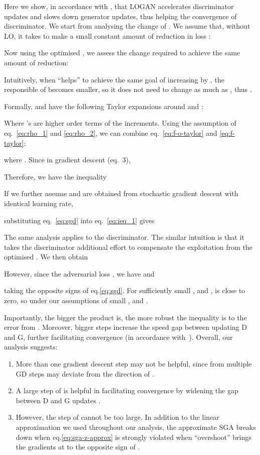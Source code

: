 \documentclass{article} \usepackage{iclr2020_conference,times}
\begin{document}
Here we show, in accordance with \cite{heusel2017gans}, that LOGAN accelerates discriminator updates and slows down generator updates, thus helping the convergence of discriminator.
We start from analysing the change of . We assume that, without LO, it takes  to make a small constant amount of reduction in loss : 

Now using the optimised , we assess the change  required to achieve the same amount of reduction:

Intuitively, when  ``helps''  to achieve the same goal of increasing  by , the responsible of  becomes smaller, so it does not need to change as much as , thus .

Formally,   and  have the following Taylor expansions around  and :

Where 's are higher order terms of the increments.
Using the assumption of eq.~\ref{eq:rho_1} and \ref{eq:rho_2}, we can combine eq.~\ref{eq:f-o-taylor} and \ref{eq:f-taylor}:

where . Since  in gradient descent (eq.~3), 

Therefore, we have the inequality

If we further assume  and   are obtained from stochastic gradient descent with identical learning rate,

substituting eq.~\ref{eq:sgd} into eq.~\ref{eq:ieq_1} gives

The same analysis applies to the discriminator. The similar intuition is that it takes the discriminator additional effort to compensate the exploitation from the optimised . We then obtain

However, since the adversarial loss , we have
 and

taking the opposite signs of eq.\ref{eq:sgd}.  
For sufficiently small ,  and ,  is close to zero, 
so  under our assumptions of small ,  and .

Importantly, the bigger the product  is, the more robust the inequality is to the error from . Moreover, bigger steps increase the speed gap between updating D and G, further facilitating convergence (in accordance with~\cite{heusel2017gans}). Overall, our analysis suggests:
\begin{enumerate}
    \item More than one gradient descent step may not be helpful, since  from multiple GD steps may deviate from the direction of .
    \item A large step of  is helpful in facilitating convergence by widening the gap between D and G updates \citep{heusel2017gans}.
    \item However, the step of  cannot be too large. In addition to the linear approximation we used throughout our analysis, the approximate SGA breaks down when eq.\ref{eq:sga-z-approx} is strongly violated when ``overshoot'' brings the gradients at  to the opposite sign of .
\end{enumerate}
\end{document}
